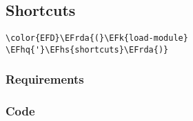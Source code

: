 \documentclass[a4wide,10pt]{article}
\newcommand{\EFk}[1]{\textcolor{EFk}{#1}} %
\newcommand{\EFhq}[1]{\textcolor{EFhq}{#1}} %
\newcommand{\EFhs}[1]{\textcolor{EFhs}{#1}} %
\newcommand{\EFrda}[1]{\textcolor{EFrda}{#1}} %
\begin{document}
\subsection{Shortcuts}
\label{sec:org3c3de9c}
\begin{Code}
\begin{Verbatim}
\color{EFD}\EFrda{(}\EFk{load-module} \EFhq{'}\EFhs{shortcuts}\EFrda{)}
\end{Verbatim}
\end{Code}
\subsubsection{Requirements}
\label{sec:org25f0d18}
\subsubsection{Code}
\label{sec:org78ce0d6}
\end{document}
